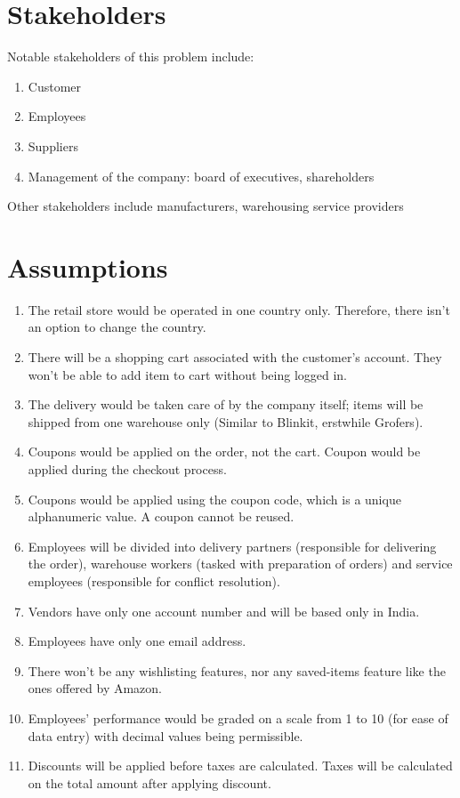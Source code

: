 \documentclass[12pt]{report}
\begin{document}
    \section{Stakeholders}
    Notable stakeholders of this problem include:
    \begin{enumerate}
        \item Customer
        \item Employees
        \item Suppliers
        \item Management of the company: board of executives, shareholders
    \end{enumerate}
    Other stakeholders include manufacturers, warehousing service providers
    
    \section{Assumptions}
    \begin{enumerate}
        \item The retail store would be operated in one country only. Therefore, there isn't an option to change the country.
        \item There will be a shopping cart associated with the customer's account. They won't be able to add item to cart without being logged in.
        \item The delivery would be taken care of by the company itself; items will be shipped from one warehouse only (Similar to Blinkit, erstwhile Grofers).
        \item Coupons would be applied on the order, not the cart. Coupon would be applied during the checkout process.
        \item Coupons would be applied using the coupon code, which is a unique alphanumeric value. A coupon cannot be reused.
        \item Employees will be divided into delivery partners (responsible for delivering the order), warehouse workers (tasked with preparation of orders) and service employees (responsible for conflict resolution).
        \item Vendors have only one account number and will be based only in India.
        \item Employees have only one email address.
        \item There won't be any wishlisting features, nor any saved-items feature like the ones offered by Amazon.
        \item Employees' performance would be graded on a scale from 1 to 10 (for ease of data entry) with decimal values being permissible.
        \item Discounts will be applied before taxes are calculated. Taxes will be calculated on the total amount after applying discount.
    \end{enumerate}
\end{document}
